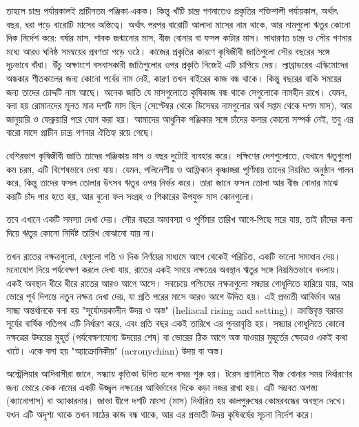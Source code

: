 তাহলে চান্দ্র পর্যায়কালই প্রাচীনতম পঞ্জিকা-একক। কিন্তু খাঁটি চান্দ্র গণনাতেও প্রকৃতির শক্তিশালী পর্যায়কাল, অর্থাৎ বছর, ধরা পড়ে বারোটি মাসের অস্তিত্বে। অর্থাৎ পরপর বারোটি আলাদা মাসের নাম থাকে, আর নামগুলো ঋতুর কোনো দিক নির্দেশ করে: বর্ষার মাস, শাবক জন্মানোর মাস, বীজ বোনার বা ফসল কাটার মাস। সাধারণত চান্দ্র ও সৌর গণনার মধ্যে আরও ঘনিষ্ঠ সমন্বয়ের প্রবণতা গড়ে ওঠে। কাজের প্রকৃতির কারণে কৃষিজীবী জাতিগুলো সৌর বছরের সঙ্গে দৃঢ়ভাবে বাঁধা। উঁচু অক্ষাংশে বসবাসকারী জাতিগুলোর ওপর প্রকৃতি নিজেই এটি চাপিয়ে দেয়। ল্যাব্রাডরের এস্কিমোদের অন্ধকার শীতকালের জন্য কোনো পর্বের নাম নেই, কারণ তখন বাইরের কাজ বন্ধ থাকে। কিন্তু বছরের বাকি সময়ের জন্য তাদের চোদ্দটি নাম আছে। অনেক জাতি যে মাসগুলোতে কৃষিকাজ বন্ধ থাকে সেগুলোকে নামহীন রাখে। যেমন, বলা হয় রোমানদের মূলত মাত্র দশটি মাস ছিল (সেপ্টেম্বর থেকে ডিসেম্বর নামগুলোর অর্থ সপ্তম থেকে দশম মাস), আর জানুয়ারি ও ফেব্রুয়ারি পরে যোগ করা হয়। আমাদের আধুনিক পঞ্জিকার সঙ্গে চাঁদের কলার কোনো সম্পর্ক নেই, তবু এর বারো মাসে প্রাচীন চান্দ্র গণনার ঐতিহ্য রয়ে গেছে।

বেশিরভাগ কৃষিজীবী জাতি তাদের পঞ্জিকায় মাস ও বছর দুটোই ব্যবহার করে। দক্ষিণের দেশগুলোতে, যেখানে ঋতুগুলো কম চরম, এটি বিশেষভাবে দেখা যায়। যেমন, পলিনেশীয় ও আফ্রিকান কৃষ্ণাঙ্গরা পূর্ণিমায় তাদের নিয়মিত অনুষ্ঠান পালন করে, কিন্তু তাদের ফসল তোলার উৎসব ঋতুর ওপর নির্ভর করে। তারা জানে ফসল তোলা আর বীজ বোনার মাঝে কয়টি চাঁদ পার হতে হয়, আর বুনো ফল সংগ্রহ ও শিকারের উপযুক্ত মাস কোনগুলো।

তবে এখানে একটি সমস্যা দেখা দেয়। সৌর বছরে অমাবস্যা ও পূর্ণিমার তারিখ আগে-পিছে সরে যায়, তাই চাঁদের কলা দিয়ে ঋতুর কোনো নির্দিষ্ট তারিখ বোঝানো যায় না।

তখন রাতের নক্ষত্রগুলো, যেগুলো গতি ও দিক নির্ণয়ের মাধ্যমে আগে থেকেই পরিচিত, একটি ভালো সমাধান দেয়। মনোযোগ দিয়ে পর্যবেক্ষণ করলে দেখা যায়, রাতের একই সময়ে নক্ষত্রের অবস্থান ঋতুর সঙ্গে নিয়মিতভাবে বদলায়। একই অবস্থান ধীরে ধীরে রাতের আরও আগে আসে। সবচেয়ে পশ্চিমের নক্ষত্রগুলো সন্ধ্যার গোধূলিতে হারিয়ে যায়, আর ভোরে পূর্ব দিগন্তে নতুন নক্ষত্র দেখা দেয়, যা প্রতি পরের মাসে আরও আগে উদিত হয়। এই প্রভাতী আবির্ভাব আর সান্ধ্য অন্তর্ধানকে বলা হয় "সূর্যোদয়কালীন উদয় ও অস্ত" (heliacal rising and setting)। ক্রান্তিবৃত্ত বরাবর সূর্যের বার্ষিক গতিপথ এটি নির্ধারণ করে, এবং প্রতি বছর একই তারিখে এর পুনরাবৃত্তি হয়। সন্ধ্যার গোধূলিতে কোনো নক্ষত্রের উদয়ের মুহূর্ত (পর্যবেক্ষণযোগ্য উদয়ের শেষ) বা ভোরের ঠিক আগে অস্ত যাওয়ার মুহূর্তের ক্ষেত্রেও একই কথা খাটে। একে বলা হয় "অ্যাক্রোনিকীয়" (acronychian) উদয় বা অস্ত।

অস্ট্রেলিয়ার আদিবাসীরা জানে, সন্ধ্যায় কৃত্তিকা উদিত হলে বসন্ত শুরু হয়। টরেস প্রণালিতে বীজ বোনার সময় নির্ধারণের জন্য ভোরে কেক নামের একটি উজ্জ্বল নক্ষত্রের আবির্ভাবের দিকে কড়া নজর রাখা হয়। এটি সম্ভবত অগস্ত্য (ক্যানোপাস) বা অ্যাকারনার। জাভা দ্বীপে দশটি মাংসা (মাস) নির্ধারিত হয় কালপুরুষের কোমরবন্ধের অবস্থান দেখে। যখন এটি অদৃশ্য থাকে তখন মাঠের কাজ বন্ধ থাকে, আর এর প্রভাতী উদয় কৃষিবর্ষের সূচনা নির্দেশ করে।

